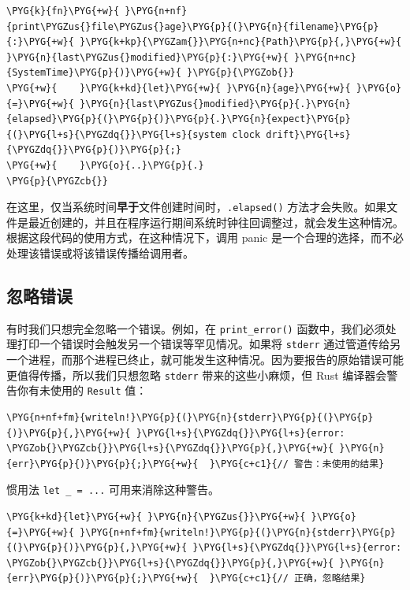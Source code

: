 \begin{Verbatim}[commandchars=\\\{\},breaklines=true,breakanywhere=true,fontsize=\codefont,xleftmargin=17bp]
\PYG{k}{fn}\PYG{+w}{ }\PYG{n+nf}{print\PYGZus{}file\PYGZus{}age}\PYG{p}{(}\PYG{n}{filename}\PYG{p}{:}\PYG{+w}{ }\PYG{k+kp}{\PYGZam{}}\PYG{n+nc}{Path}\PYG{p}{,}\PYG{+w}{ }\PYG{n}{last\PYGZus{}modified}\PYG{p}{:}\PYG{+w}{ }\PYG{n+nc}{SystemTime}\PYG{p}{)}\PYG{+w}{ }\PYG{p}{\PYGZob{}}
\PYG{+w}{    }\PYG{k+kd}{let}\PYG{+w}{ }\PYG{n}{age}\PYG{+w}{ }\PYG{o}{=}\PYG{+w}{ }\PYG{n}{last\PYGZus{}modified}\PYG{p}{.}\PYG{n}{elapsed}\PYG{p}{(}\PYG{p}{)}\PYG{p}{.}\PYG{n}{expect}\PYG{p}{(}\PYG{l+s}{\PYGZdq{}}\PYG{l+s}{system clock drift}\PYG{l+s}{\PYGZdq{}}\PYG{p}{)}\PYG{p}{;}
\PYG{+w}{    }\PYG{o}{..}\PYG{p}{.}
\PYG{p}{\PYGZcb{}}
\end{Verbatim}

在这里，仅当系统时间\textbf{早于}文件创建时间时，\texttt{.elapsed()} 方法才会失败。如果文件是最近创建的，并且在程序运行期间系统时钟往回调整过，就会发生这种情况。根据这段代码的使用方式，在这种情况下，调用 panic 是一个合理的选择，而不必处理该错误或将该错误传播给调用者。

\subsection{忽略错误}

有时我们只想完全忽略一个错误。例如，在 \texttt{print\_error()} 函数中，我们必须处理打印一个错误时会触发另一个错误等罕见情况。如果将 \texttt{stderr} 通过管道传给另一个进程，而那个进程已终止，就可能发生这种情况。因为要报告的原始错误可能更值得传播，所以我们只想忽略 \texttt{stderr} 带来的这些小麻烦，但 Rust 编译器会警告你有未使用的 \texttt{Result} 值：

\begin{Verbatim}[commandchars=\\\{\},breaklines=true,breakanywhere=true,fontsize=\codefont,xleftmargin=17bp]
\PYG{n+nf+fm}{writeln!}\PYG{p}{(}\PYG{n}{stderr}\PYG{p}{(}\PYG{p}{)}\PYG{p}{,}\PYG{+w}{ }\PYG{l+s}{\PYGZdq{}}\PYG{l+s}{error: \PYGZob{}\PYGZcb{}}\PYG{l+s}{\PYGZdq{}}\PYG{p}{,}\PYG{+w}{ }\PYG{n}{err}\PYG{p}{)}\PYG{p}{;}\PYG{+w}{  }\PYG{c+c1}{// 警告：未使用的结果}
\end{Verbatim}

惯用法 \texttt{let \_ = ...} 可用来消除这种警告。

\begin{Verbatim}[commandchars=\\\{\},breaklines=true,breakanywhere=true,fontsize=\codefont,xleftmargin=17bp]
\PYG{k+kd}{let}\PYG{+w}{ }\PYG{n}{\PYGZus{}}\PYG{+w}{ }\PYG{o}{=}\PYG{+w}{ }\PYG{n+nf+fm}{writeln!}\PYG{p}{(}\PYG{n}{stderr}\PYG{p}{(}\PYG{p}{)}\PYG{p}{,}\PYG{+w}{ }\PYG{l+s}{\PYGZdq{}}\PYG{l+s}{error: \PYGZob{}\PYGZcb{}}\PYG{l+s}{\PYGZdq{}}\PYG{p}{,}\PYG{+w}{ }\PYG{n}{err}\PYG{p}{)}\PYG{p}{;}\PYG{+w}{  }\PYG{c+c1}{// 正确，忽略结果}
\end{Verbatim}

